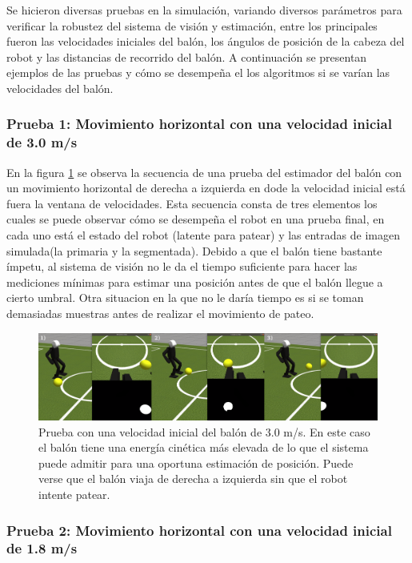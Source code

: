 	Se hicieron diversas pruebas en la simulación, variando diversos parámetros para verificar la robustez del sistema de visión y estimación, entre los principales fueron las velocidades iniciales del balón, los ángulos de posición de la cabeza del robot y las distancias de recorrido del balón. A continuación se presentan ejemplos de las pruebas y cómo se desempeña el los algoritmos si se varían las velocidades del balón.
	
	\subsubsection*{Prueba 1: Movimiento horizontal con una velocidad inicial de 3.0 m/s}
	En la figura \ref{fig:prueba_1} se observa la secuencia de una prueba del estimador del balón con un movimiento horizontal de derecha a izquierda en dode la velocidad inicial está fuera la ventana de velocidades. Esta secuencia consta de tres elementos los cuales se puede observar cómo se desempeña el robot en una prueba final, en cada uno está el estado del robot (latente para patear) y las entradas de imagen simulada(la primaria y la segmentada).
	Debido a que el balón tiene bastante ímpetu, al sistema de visión no le da el tiempo suficiente para hacer las mediciones mínimas para estimar una posición antes de que el balón llegue a cierto umbral. Otra situacion en la que no le daría tiempo es si se toman demasiadas muestras antes de realizar el movimiento de pateo.
	
\begin{figure}
\centering
	\includegraphics[scale=0.26]{images/prueba_1.png}
	\caption{Prueba con una velocidad inicial del balón de 3.0 m/s. En este caso el balón tiene una energía cinética más elevada de lo que el sistema puede admitir para una oportuna estimación de posición. Puede verse que el balón viaja de derecha a izquierda sin que el robot intente patear.}
	\label{fig:prueba_1}
\end{figure}

	\subsubsection*{Prueba 2: Movimiento horizontal con una velocidad inicial de 1.8 m/s}

